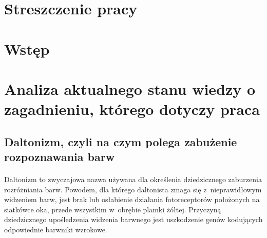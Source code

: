 \documentclass[12pt, letterpaper]{article}
\begin{document}
\setlength{\parindent}{1cm}
\newpage

\section{Streszczenie pracy}

\tableofcontents

\newpage

\section{Wstęp}


\newpage
\section{Analiza aktualnego stanu wiedzy o zagadnieniu, którego dotyczy praca}
\subsection{Daltonizm, czyli na czym polega zabużenie rozpoznawania barw}
\paragraph{}
Daltonizm to zwyczajowa nazwa używana dla określenia dziedzicznego zaburzenia rozróżniania barw. Powodem, dla którego daltonista zmaga się z~nieprawidłowym widzeniem barw, jest brak lub osłabienie działania fotoreceptorów położonych na siatkówce oka, przede wszystkim w~obrębie plamki żółtej. Przyczyną dziedzicznego upośledzenia widzenia barwnego jest uszkodzenie genów kodujących odpowiednie barwniki wzrokowe.
\end{document}
